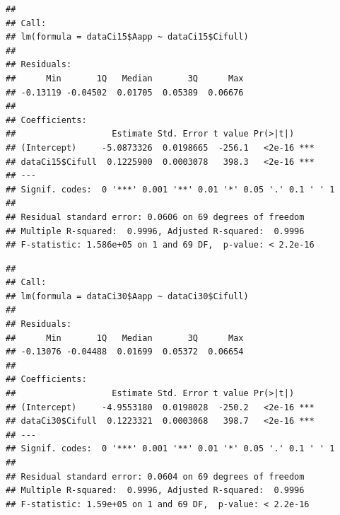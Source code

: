 \documentclass[
]{krantz}
\makeatletter
\newenvironment{Shaded}{\begin{snugshade}}{\end{snugshade}}
\newcommand{\DecValTok}[1]{\textcolor[rgb]{0.00,0.00,0.81}{#1}}
\newcommand{\FunctionTok}[1]{\textcolor[rgb]{0.00,0.00,0.00}{#1}}
\newcommand{\NormalTok}[1]{#1}
\newcommand{\OtherTok}[1]{\textcolor[rgb]{0.56,0.35,0.01}{#1}}
\newcommand{\SpecialCharTok}[1]{\textcolor[rgb]{0.00,0.00,0.00}{#1}}
\newenvironment{kframe}{%
\medskip{}
\setlength{\fboxsep}{.8em}
 \def\at@end@of@kframe{}%
 \ifinner\ifhmode%
  \def\at@end@of@kframe{\end{minipage}}%
  \begin{minipage}{\columnwidth}%
 \fi\fi%
 \def\FrameCommand##1{\hskip\@totalleftmargin \hskip-\fboxsep
 \colorbox{shadecolor}{##1}\hskip-\fboxsep
     \hskip-\linewidth \hskip-\@totalleftmargin \hskip\columnwidth}%
 \MakeFramed {\advance\hsize-\width
   \@totalleftmargin\z@ \linewidth\hsize
   \@setminipage}}%
 {\par\unskip\endMakeFramed%
 \at@end@of@kframe}
\renewenvironment{Shaded}{\begin{kframe}}{\end{kframe}}
\makeatother
\begin{document}
\begin{verbatim}
## 
## Call:
## lm(formula = dataCi15$Aapp ~ dataCi15$Cifull)
## 
## Residuals:
##      Min       1Q   Median       3Q      Max 
## -0.13119 -0.04502  0.01705  0.05389  0.06676 
## 
## Coefficients:
##                   Estimate Std. Error t value Pr(>|t|)    
## (Intercept)     -5.0873326  0.0198665  -256.1   <2e-16 ***
## dataCi15$Cifull  0.1225900  0.0003078   398.3   <2e-16 ***
## ---
## Signif. codes:  0 '***' 0.001 '**' 0.01 '*' 0.05 '.' 0.1 ' ' 1
## 
## Residual standard error: 0.0606 on 69 degrees of freedom
## Multiple R-squared:  0.9996, Adjusted R-squared:  0.9996 
## F-statistic: 1.586e+05 on 1 and 69 DF,  p-value: < 2.2e-16
\end{verbatim}

\begin{Shaded}
\end{Shaded}

\begin{verbatim}
## 
## Call:
## lm(formula = dataCi30$Aapp ~ dataCi30$Cifull)
## 
## Residuals:
##      Min       1Q   Median       3Q      Max 
## -0.13076 -0.04488  0.01699  0.05372  0.06654 
## 
## Coefficients:
##                   Estimate Std. Error t value Pr(>|t|)    
## (Intercept)     -4.9553180  0.0198028  -250.2   <2e-16 ***
## dataCi30$Cifull  0.1223321  0.0003068   398.7   <2e-16 ***
## ---
## Signif. codes:  0 '***' 0.001 '**' 0.01 '*' 0.05 '.' 0.1 ' ' 1
## 
## Residual standard error: 0.0604 on 69 degrees of freedom
## Multiple R-squared:  0.9996, Adjusted R-squared:  0.9996 
## F-statistic: 1.59e+05 on 1 and 69 DF,  p-value: < 2.2e-16
\end{verbatim}

\begin{Shaded}
\end{Shaded}
\end{document}
